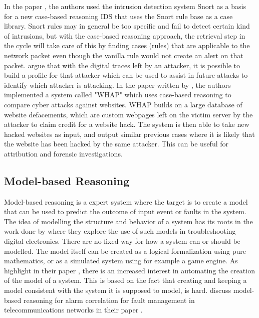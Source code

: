 In the paper , the authors \textcite{schwartz_2002} used the intrusion detection system Snort as a basis for a new case-based reasoning IDS that uses the Snort rule base as a case library. Snort rules may in general be too specific and fail to detect certain kind of intrusions, but with the case-based reasoning approach, the retrieval step in the cycle will take care of this by finding cases (rules) that are applicable to the network packet even though the vanilla rule would not create an alert on that packet.
\textcite{Kapetanakis_2014} argue that with the digital traces left by an attacker, it is possible to build a profile for that attacker which can be used to assist in future attacks to identify which attacker is attacking. In the paper written by \textcite{han_2016}, the authors implemented a system called "WHAP" which uses case-based reasoning to compare cyber attacks against websites. WHAP builds on a large database of website defacements, which are custom webpages left on the victim server by the attacker to claim credit for a website hack. The system is then able to take new hacked websites as input, and output similar previous cases where it is likely that the website has been hacked by the same attacker. This can be useful for attribution and forensic investigations.

\subsection{Model-based Reasoning}
Model-based reasoning is a expert system where the target is to create a model that can be used to predict the outcome of input event or faults in the system. The idea of modelling the structure and behavior of a system has its roots in the work done by \textcite{davies_1987} where they explore the use of such models in troubleshooting digital electronics.  There are no fixed way for how a system can or should be modelled. The model itself can be created as a logical formalization using pure mathematics, or as a simulated system using for example a game engine. As \textcite{Dodig-Crnkovic2017} highlight in their paper , there is an increased interest in automating the creation of the model of a system. This is based on the fact that creating and keeping a model consistent with the system it is supposed to model, is hard.
\textcite{jakobson_1993} discuss model-based reasoning for alarm correlation for fault management in telecommunications networks in their paper .


